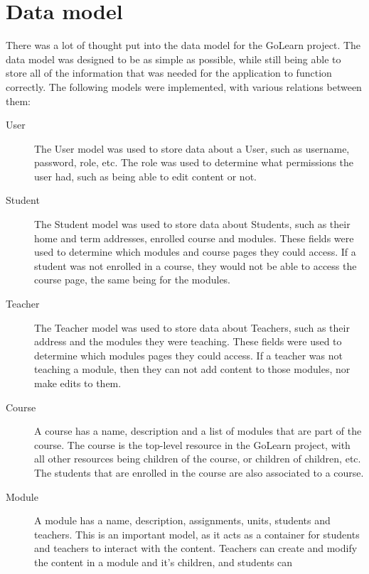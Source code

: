 \documentclass[12pt, a4paper,twoside]{report}
\theoremstyle{plain} %
\theoremstyle{definition} %
\numberwithin{equation}{chapter}
\begin{document}
\section{Data model}\label{sec:datamodel}

There was a lot of thought put into the data model for the GoLearn project.
The data model was designed to be as simple as possible, while still being
able to store all of the information that was needed for the application to
function correctly. The following models were implemented, with various
relations between them:

\begin{description}

    \item[User] {
        The User model was used to store data about a User, such as username,
        password, role, etc. The role was used to determine what permissions
        the user had, such as being able to edit content or not.
    }
    \item[Student] {
        The Student model was used to store data about Students, such as their
        home and term addresses, enrolled course and modules. These fields were
        used to determine which modules and course pages they could access. If
        a student was not enrolled in a course, they would not be able to access
        the course page, the same being for the modules.
    }
    \item[Teacher] {
        The Teacher model was used to store data about Teachers, such as their
        address and the modules they were teaching. These fields were used to
        determine which modules pages they could access. If a teacher was not
        teaching a module, then they can not add content to those modules, nor
        make edits to them.
    }
    \item[Course] {
        A course has a name, description and a list of modules that are part of
        the course. The course is the top-level resource in the GoLearn project,
        with all other resources being children of the course, or children of
        children, etc. The students that are enrolled in the course are also
        associated to a course.
    }
    \item[Module] {
        A module has a name, description, assignments, units, students and
        teachers. This is an important model, as it acts as a container for
        students and teachers to interact with the content. Teachers can create
        and modify the content in a module and it's children, and students can
}
\end{description}
\end{document}
